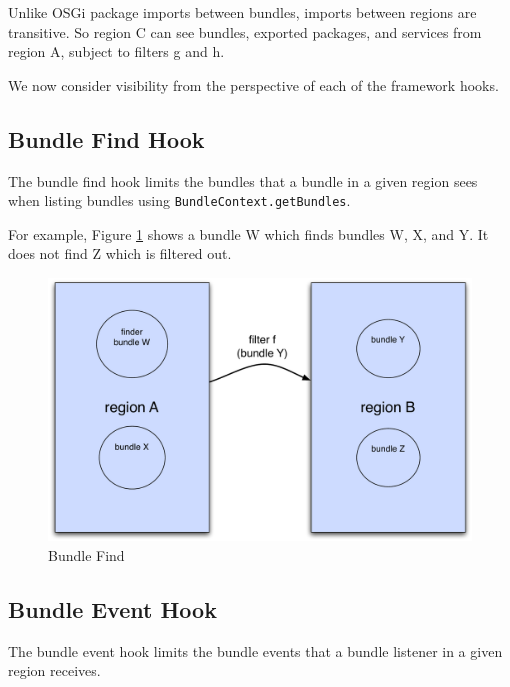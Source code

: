 \documentclass[a4paper,9pt,twoside]{article}
\begin{document}
Unlike OSGi package imports between bundles, imports between regions are transitive.
So region C can see bundles, exported packages, and services from region A, subject to filters g and h.

We now consider visibility from the perspective of each of the framework hooks.

\subsection{Bundle Find Hook}

The bundle find hook limits the bundles that a bundle in a given region sees when listing bundles using
\texttt{BundleContext.getBundles}.

For example, Figure \ref{fig:bfind} shows a bundle W which finds bundles W, X, and Y.
It does not find Z which is filtered out. 
\begin{figure}[h!]
\begin{center}
\includegraphics*[scale=0.4]{bundle-find.pdf}
\caption{Bundle Find \label{fig:bfind}}
\end{center}
\end{figure}

\subsection{Bundle Event Hook}

The bundle event hook limits the bundle events that a bundle listener in a given region receives.
\end{document}
